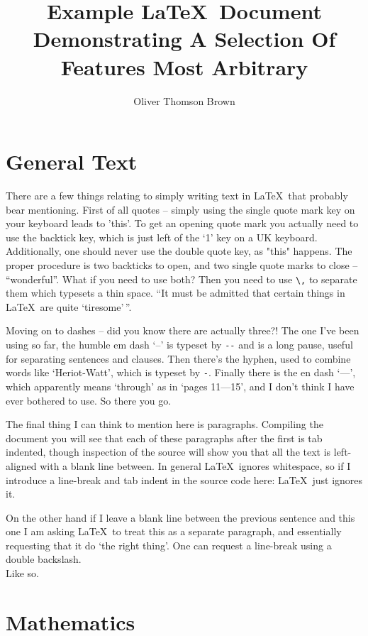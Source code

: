 \documentclass[a4paper,11pt,twoside]{article}		%
\author{Oliver Thomson Brown}
\title{\textbf{Example \LaTeX\ Document} \\ {\Fontamici Demonstrating A Selection Of Features Most Arbitrary}}
\date{}
\begin{document}
\maketitle

\tableofcontents

\section{General Text}
\label{sec:1}

There are a few things relating to simply writing text in \LaTeX\ that probably bear mentioning. First of all quotes -- simply using the single quote mark key on your keyboard leads to 'this'. To get an opening quote mark you actually need to use the backtick key, which is just left of the `1' key on a UK keyboard. Additionally, one should never use the double quote key, as "this" happens. The proper procedure is two backticks to open, and two single quote marks to close -- ``wonderful''. What if you need to use both? Then you need to use \verb:\,: to separate them which typesets a thin space. ``It must be admitted that certain things in \LaTeX\ are quite `tiresome'\,''.

Moving on to dashes -- did you know there are actually three?! The one I've been using so far, the humble em dash `--' is typeset by \verb:--: and is a long pause, useful for separating sentences and clauses. Then there's the hyphen, used to combine words like `Heriot-Watt', which is typeset by \verb:-:. Finally there is the en dash `---', which apparently means `through' as in `pages 11---15', and I don't think I have ever bothered to use. So there you go.

The final thing I can think to mention here is paragraphs. Compiling the document you will see that each of these paragraphs after the first is tab indented, though inspection of the source will show you that all the text is left-aligned with a blank line between. In general \LaTeX\ ignores whitespace, so if I introduce a line-break and tab indent in the source code here:
	\LaTeX\ just ignores it.

On the other hand if I leave a blank line between the previous sentence and this one I am asking \LaTeX\ to treat this as a separate paragraph, and essentially requesting that it do `the right thing'. One can request a line-break using a double backslash.\\ Like so. 

\section{Mathematics}
\label{sec:2}
\end{document}
